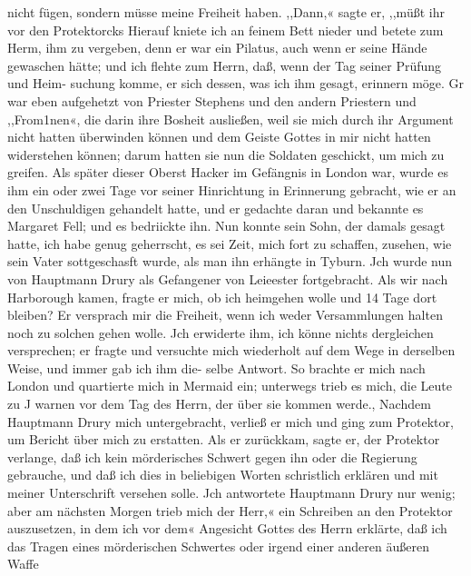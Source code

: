 nicht fügen, sondern müsse meine Freiheit haben. ,,Dann,« sagte
er, ,,müßt ihr vor den Protektorcks Hierauf kniete ich an feinem
Bett nieder und betete zum Herm, ihm zu vergeben, denn er war
ein Pilatus, auch wenn er seine Hände gewaschen hätte; und ich
flehte zum Herrn, daß, wenn der Tag seiner Prüfung und Heim-
suchung komme, er sich dessen, was ich ihm gesagt, erinnern möge.
Gr war eben aufgehetzt von Priester Stephens und den andern
Priestern und ,,From1nen«, die darin ihre Bosheit ausließen, weil
sie mich durch ihr Argument nicht hatten überwinden können
und dem Geiste Gottes in mir nicht hatten widerstehen können;
darum hatten sie nun die Soldaten geschickt, um mich zu greifen.
Als später dieser Oberst Hacker im Gefängnis in London
war, wurde es ihm ein oder zwei Tage vor seiner Hinrichtung
in Erinnerung gebracht, wie er an den Unschuldigen gehandelt
hatte, und er gedachte daran und bekannte es Margaret Fell;
und es bedriickte ihn. Nun konnte sein Sohn, der damals
gesagt hatte, ich habe genug geherrscht, es sei Zeit, mich fort zu
schaffen, zusehen, wie sein Vater sottgeschasft wurde, als man ihn
erhängte in Tyburn.
Jch wurde nun von Hauptmann Drury als Gefangener von
Leieester fortgebracht. Als wir nach Harborough kamen, fragte
er mich, ob ich heimgehen wolle und 14 Tage dort bleiben? Er
versprach mir die Freiheit, wenn ich weder Versammlungen halten
noch zu solchen gehen wolle. Jch erwiderte ihm, ich könne nichts
dergleichen versprechen; er fragte und versuchte mich wiederholt
auf dem Wege in derselben Weise, und immer gab ich ihm die-
selbe Antwort. So brachte er mich nach London und quartierte
mich in Mermaid ein; unterwegs trieb es mich, die Leute zu J
warnen vor dem Tag des Herrn, der über sie kommen werde.,
Nachdem Hauptmann Drury mich untergebracht, verließ er mich
und ging zum Protektor, um Bericht über mich zu erstatten. Als
er zurückkam, sagte er, der Protektor verlange, daß ich kein
mörderisches Schwert gegen ihn oder die Regierung gebrauche,
und daß ich dies in beliebigen Worten schristlich erklären und mit
meiner Unterschrift versehen solle. Jch antwortete Hauptmann
Drury nur wenig; aber am nächsten Morgen trieb mich der Herr,«
ein Schreiben an den Protektor auszusetzen, in dem ich vor dem«
Angesicht Gottes des Herrn erklärte, daß ich das Tragen eines
mörderischen Schwertes oder irgend einer anderen äußeren Waffe


